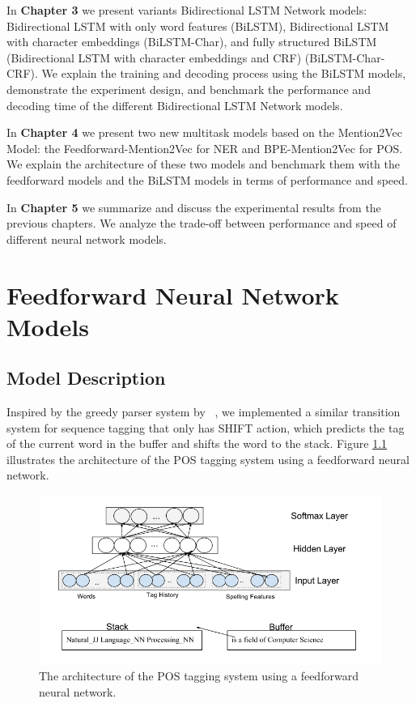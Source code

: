 \documentclass{sfuthesis}
\begin{document}
In \textbf{Chapter 3} we present variants Bidirectional LSTM Network models: Bidirectional LSTM with only word features (BiLSTM), Bidirectional LSTM with character embeddings (BiLSTM-Char), and fully structured BiLSTM (Bidirectional LSTM with character embeddings and CRF) (BiLSTM-Char-CRF). We explain the training and decoding process using the BiLSTM models, demonstrate the experiment design, and benchmark the performance and decoding time of the different Bidirectional LSTM Network models.

In \textbf{Chapter 4} we present two new multitask models based on the Mention2Vec Model: the Feedforward-Mention2Vec for NER and BPE-Mention2Vec for POS. We explain the architecture of these two models and benchmark them with the feedforward models and the BiLSTM models in terms of performance and speed.

In \textbf{Chapter 5} we summarize and discuss the experimental results from the previous chapters. We analyze the trade-off between performance and speed of different neural network models.


\chapter{Feedforward Neural Network Models}

\section{Model Description}
\label{Feedforward-CRF}
Inspired by the greedy parser system by ~\cite{chen2014fast}, we implemented a similar transition system for sequence tagging that only has SHIFT action, which predicts the tag of the current word in the buffer and shifts the word to the stack. Figure \ref{fig:greedypos} illustrates the architecture of the POS tagging system using a feedforward neural network.

\begin{figure}
  \centering
  \includegraphics[scale=0.6]{greedypos.png}
 \caption{The architecture of the POS tagging system using a feedforward neural network.}
  \label{fig:greedypos}
\end{figure}
\end{document}
